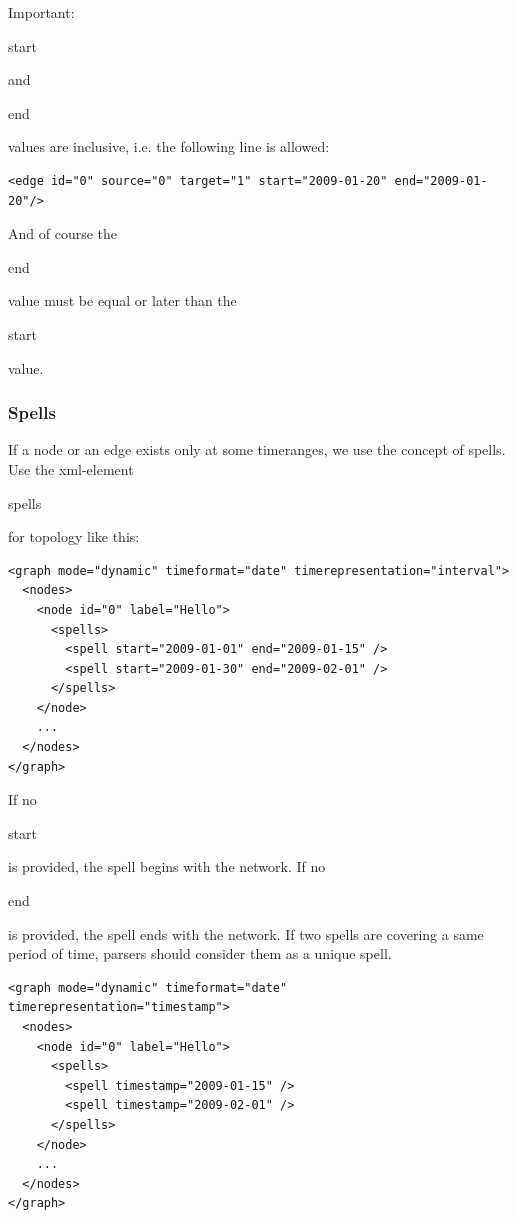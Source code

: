 \documentclass[a4paper,10pt]{article}
\begin{document}
Important: \begin{footnotesize}start\end{footnotesize} and \begin{footnotesize}end\end{footnotesize} values are inclusive, i.e. the following line is allowed:

\lstset{ style=gexf }
\begin{lstlisting}[caption={Smallest time scope}]
<edge id="0" source="0" target="1" start="2009-01-20" end="2009-01-20"/>
\end{lstlisting}

And of course the \begin{footnotesize}end\end{footnotesize} value must be equal or later than the \begin{footnotesize}start\end{footnotesize} value.

\subsubsection{Spells}

If a node or an edge exists only at some timeranges, we use the concept of spells. Use the xml-element \begin{footnotesize}spells\end{footnotesize} for topology like this:

\lstset{ style=gexf }
\begin{lstlisting}[caption={Node with multiple spells (Intervals)}]
<graph mode="dynamic" timeformat="date" timerepresentation="interval">
  <nodes>
    <node id="0" label="Hello">
      <spells>
        <spell start="2009-01-01" end="2009-01-15" />
        <spell start="2009-01-30" end="2009-02-01" />
      </spells>
    </node>
    ...
  </nodes>
</graph>
\end{lstlisting}

If no \begin{footnotesize}start\end{footnotesize} is provided, the spell begins with the network. If no \begin{footnotesize}end\end{footnotesize} is provided, the spell ends with the network. If two spells are covering a same period of time, parsers should consider them as a unique spell.

\lstset{ style=gexf }
\begin{lstlisting}[caption={Node with multiple spells (Timestamps)}]
<graph mode="dynamic" timeformat="date" timerepresentation="timestamp">
  <nodes>
    <node id="0" label="Hello">
      <spells>
        <spell timestamp="2009-01-15" />
        <spell timestamp="2009-02-01" />
      </spells>
    </node>
    ...
  </nodes>
</graph>
\end{lstlisting}
\end{document}

